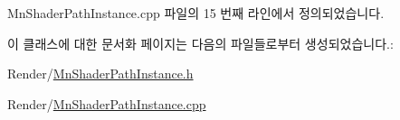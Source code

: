 Mn\+Shader\+Path\+Instance.\+cpp 파일의 15 번째 라인에서 정의되었습니다.



이 클래스에 대한 문서화 페이지는 다음의 파일들로부터 생성되었습니다.\+:\begin{DoxyCompactItemize}
\item 
Render/\hyperlink{_mn_shader_path_instance_8h}{Mn\+Shader\+Path\+Instance.\+h}\item 
Render/\hyperlink{_mn_shader_path_instance_8cpp}{Mn\+Shader\+Path\+Instance.\+cpp}\end{DoxyCompactItemize}
